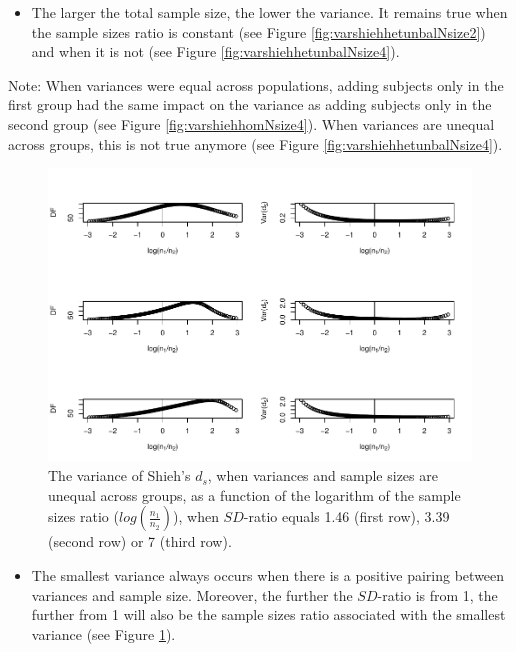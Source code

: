 \documentclass[
  english,
  man]{apa6}
\providecommand{\tightlist}{%
  \setlength{\itemsep}{0pt}\setlength{\parskip}{0pt}}
\begin{document}
\begin{itemize}
\tightlist
\item
  The larger the total sample size, the lower the variance. It remains true when the sample sizes ratio is constant (see Figure \ref{fig:varshiehhetunbalNsize2}) and when it is not (see Figure \ref{fig:varshiehhetunbalNsize4}).
\end{itemize}

Note: When variances were equal across populations, adding subjects only in the first group had the same impact on the variance as adding subjects only in the second group (see Figure \ref{fig:varshiehhomNsize4}). When variances are unequal across groups, this is not true anymore (see Figure \ref{fig:varshiehhetunbalNsize4}).

\begin{figure}
\centering
\includegraphics{Theoretical-Variance-of-all-estimators-as-a-function-of-population-parameters_files/figure-latex/varshiehhetunbaldfandvar-1.pdf}
\caption{\label{fig:varshiehhetunbaldfandvar}The variance of Shieh's \(d_s\), when variances and sample sizes are unequal across groups, as a function of the logarithm of the sample sizes ratio (\(log \left( \frac{n_1}{n_2} \right)\)), when \(SD\)-ratio equals 1.46 (first row), 3.39 (second row) or 7 (third row).}
\end{figure}

\begin{itemize}
\tightlist
\item
  The smallest variance always occurs when there is a positive pairing between variances and sample size. Moreover, the further the \(SD\)-ratio is from 1, the further from 1 will also be the sample sizes ratio associated with the smallest variance (see Figure \ref{fig:varshiehhetunbaldfandvar}).
\end{itemize}
\end{document}
